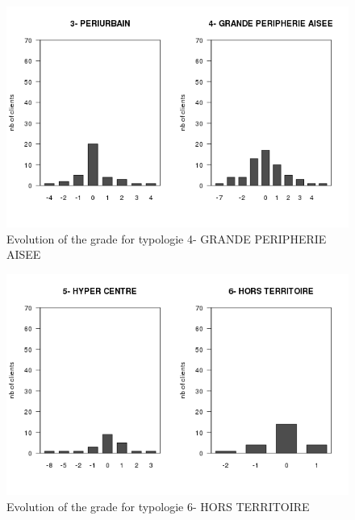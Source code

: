 \documentclass[a4paper, 11pt]{article}
\begin{document}
        \begin{figure}[!ht]
                \centering
                \includegraphics[height = 10 cm]{Remi/Evolution_of_the_grade_for_typologie_4- GRANDE PERIPHERIE AISEE.png}
                \caption{Evolution of the grade for typologie 4- GRANDE PERIPHERIE AISEE}
                \label{fig:e_typo4}
        \end{figure}

        \begin{figure}[!ht]
                \centering
                \includegraphics[height = 10 cm]{Remi/Evolution_of_the_grade_for_typologie_6- HORS TERRITOIRE.png}
                \caption{Evolution of the grade for typologie 6- HORS TERRITOIRE}
                \label{fig:e_typo6}
        \end{figure}
        
\end{document}
